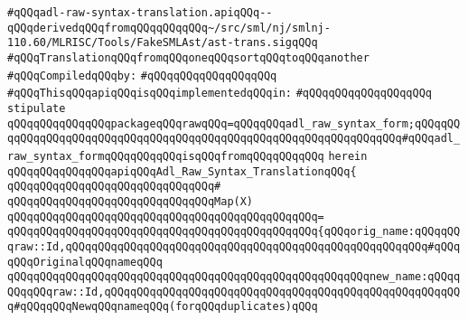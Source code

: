 \label{src/lib/compiler/back/low/tools/adl-syntax/adl-raw-syntax-translation.api}
\verb|#qQQqadl-raw-syntax-translation.apiqQQq--qQQqderivedqQQqfromqQQqqQQqqQQq~/src/sml/nj/smlnj-110.60/MLRISC/Tools/FakeSMLAst/ast-trans.sigqQQq|\newline
\verb|#qQQqTranslationqQQqfromqQQqoneqQQqsortqQQqtoqQQqanother|\newline
\newline
\verb|#qQQqCompiledqQQqby:|\newline
\verb|#qQQqqQQqqQQqqQQqqQQq|\newline
\newline
\verb|#qQQqThisqQQqapiqQQqisqQQqimplementedqQQqin:|\newline
\verb|#qQQqqQQqqQQqqQQqqQQq|\newline
\newline
\verb|stipulate|\newline
\verb|qQQqqQQqqQQqqQQqpackageqQQqrawqQQq=qQQqqQQqadl_raw_syntax_form;qQQqqQQqqQQqqQQqqQQqqQQqqQQqqQQqqQQqqQQqqQQqqQQqqQQqqQQqqQQqqQQqqQQq#qQQqadl_raw_syntax_formqQQqqQQqqQQqisqQQqfromqQQqqQQqqQQq|\newline
\verb|herein|\newline
\newline
\verb|qQQqqQQqqQQqqQQqapiqQQqAdl_Raw_Syntax_TranslationqQQq{|\newline
\verb|qQQqqQQqqQQqqQQqqQQqqQQqqQQqqQQq#|\newline
\newline
\verb|qQQqqQQqqQQqqQQqqQQqqQQqqQQqqQQqMap(X)|\newline
\verb|qQQqqQQqqQQqqQQqqQQqqQQqqQQqqQQqqQQqqQQqqQQqqQQq=|\newline
\verb|qQQqqQQqqQQqqQQqqQQqqQQqqQQqqQQqqQQqqQQqqQQqqQQq{qQQqorig_name:qQQqqQQqraw::Id,qQQqqQQqqQQqqQQqqQQqqQQqqQQqqQQqqQQqqQQqqQQqqQQqqQQqqQQq#qQQqqQQqOriginalqQQqnameqQQq|\newline
\verb|qQQqqQQqqQQqqQQqqQQqqQQqqQQqqQQqqQQqqQQqqQQqqQQqqQQqqQQqnew_name:qQQqqQQqqQQqraw::Id,qQQqqQQqqQQqqQQqqQQqqQQqqQQqqQQqqQQqqQQqqQQqqQQqqQQqqQQq#qQQqqQQqNewqQQqnameqQQq(forqQQqduplicates)qQQq|\newline

